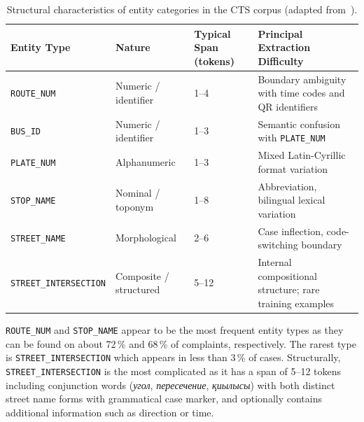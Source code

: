\begin{table}[H]
\centering
\caption{Structural characteristics of entity categories in the CTS corpus (adapted from~\cite{ussenbayeva2026heterogeneous}).}
\label{tab:entity_typology}
\renewcommand{\arraystretch}{1.3}
\begin{tabular}{llp{2.2cm}p{3.8cm}}
\toprule
\textbf{Entity Type} & \textbf{Nature} & \textbf{Typical Span (tokens)} & \textbf{Principal Extraction Difficulty} \\
\midrule
\texttt{ROUTE\_NUM}           & Numeric / identifier  & 1--4   & Boundary ambiguity with time codes and QR identifiers \\
\texttt{BUS\_ID}              & Numeric / identifier  & 1--3   & Semantic confusion with \texttt{PLATE\_NUM} \\
\texttt{PLATE\_NUM}           & Alphanumeric          & 1--3   & Mixed Latin-Cyrillic format variation \\
\texttt{STOP\_NAME}           & Nominal / toponym     & 1--8   & Abbreviation, bilingual lexical variation \\
\texttt{STREET\_NAME}         & Morphological         & 2--6   & Case inflection, code-switching boundary \\
\texttt{STREET\_INTERSECTION} & Composite / structured & 5--12 & Internal compositional structure; rare training examples \\
\bottomrule
\end{tabular}
\end{table}

\texttt{ROUTE\_NUM} and \texttt{STOP\_NAME} appear to be the most frequent entity types as they can be found on about 72\,\% and 68\,\% of complaints, respectively. The rarest type is \texttt{STREET\_INTERSECTION} which appears in less than 3\,\% of cases. Structurally, \texttt{STREET\_INTERSECTION} is the most complicated as it has a span of 5--12 tokens including conjunction words (\foreignlanguage{russian}{\textit{угол}}, \foreignlanguage{russian}{\textit{пересечение}}, \foreignlanguage{russian}{\textit{қиылысы}}) with both distinct street name forms with grammatical case marker, and optionally contains additional information such as direction or time.

